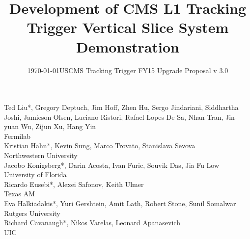 \documentclass{cmspaper}
\begin{document}
\begin{titlepage}
\date{\today}
\date{USCMS Tracking Trigger FY15 Upgrade Proposal v 3.0}
\title{Development of CMS L1 Tracking Trigger Vertical Slice System Demonstration}
\begin{Authlist}

Ted Liu*, Gregory Deptuch, Jim Hoff, Zhen Hu, Sergo Jindariani, Siddhartha Joshi, Jamieson Olsen, Luciano Ristori, Rafael Lopes De Sa, Nhan Tran, Jin-yuan Wu, Zijun Xu, Hang Yin \\
Fermilab\\ 

Kristian Hahn*, Kevin Sung, Marco Trovato, Stanislava Sevova \\
Northwestern University\\ 

Jacobo Konigsberg*, Darin Acosta, Ivan Furic, Souvik Das,  Jia Fu Low\\
University of Florida\\ 

Ricardo Eusebi*, Alexei Safonov, Keith Ulmer \\
Texas AM\\ 

Eva Halkiadakis*, Yuri Gershtein, Amit Lath, Robert Stone, Sunil Somalwar \\
Rutgers University\\ 

Richard Cavanaugh*, Nikos Varelas, Leonard Apanasevich \\
UIC\\

\end{Authlist}


\begin{abstract}


\end{abstract}
\end{titlepage}
\end{document}
